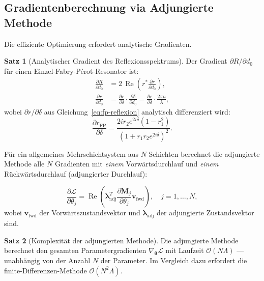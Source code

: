 ﻿\documentclass[a4paper,12pt]{article}
\theoremstyle{definition}
\newtheorem{satz}{Satz}[section]
\newcommand{\ordre}[1]{\mathcal{O}\!\left(#1\right)}
\newcommand{\Realteil}{\operatorname{Re}}
\newcommand{\vect}[1]{\bm{#1}}
\newcommand{\matr}[1]{\mathbf{#1}}
\begin{document}
	\subsection{Gradientenberechnung via Adjungierte Methode}
	
	Die effiziente Optimierung erfordert analytische Gradienten.
	
	\begin{satz}[Analytischer Gradient des Reflexionsspektrums]
		\label{satz:gradient}
		Der Gradient $\partial R/\partial d_0$ für einen Einzel-Fabry-Pérot-Resonator ist:
		\begin{align}
			\frac{\partial R}{\partial d_0}
			&= 2\,\Realteil\!\left(r^* \frac{\partial r}{\partial d_0}\right),
			\label{eq:gradient-R}\\
			\frac{\partial r}{\partial d_0}
			&= \frac{\partial r}{\partial \delta} \cdot \frac{\partial \delta}{\partial d_0}
			= \frac{\partial r}{\partial \delta} \cdot \frac{2\pi n}{\lambda},
			\label{eq:gradient-r}
		\end{align}
		wobei $\partial r/\partial\delta$ aus Gleichung~\eqref{eq:fp-reflexion}
		analytisch differenziert wird:
		\begin{equation}
			\frac{\partial r_\mathrm{FP}}{\partial \delta}
			= \frac{2i r_2 e^{2i\delta}(1 - r_1^2)}
			{(1 + r_1 r_2 e^{2i\delta})^2}.
			\label{eq:dr-ddelta}
		\end{equation}
	\end{satz}
	
	Für ein allgemeines Mehrschichtsystem aus $N$ Schichten berechnet die
	adjungierte Methode alle $N$ Gradienten mit \emph{einem} Vorwärtsdurchlauf
	und \emph{einem} Rückwärtsdurchlauf (adjungierter Durchlauf):
	
	\begin{equation}
		\frac{\partial \mathcal{L}}{\partial \theta_j} = \Realteil\!\left(
		\vect{\lambda}_\mathrm{adj}^T \frac{\partial \matr{M}_j}{\partial \theta_j} \vect{v}_\mathrm{fwd}
		\right), \quad j = 1,\ldots,N,
		\label{eq:adjoint}
	\end{equation}
	wobei $\vect{v}_\mathrm{fwd}$ der Vorwärtszustandsvektor und
	$\vect{\lambda}_\mathrm{adj}$ der adjungierte Zustandsvektor sind.
	
	\begin{satz}[Komplexität der adjungierten Methode]
		\label{satz:adjoint-komplex}
		Die adjungierte Methode berechnet den gesamten Parametergradienten
		$\nabla_{\vect{\theta}}\mathcal{L}$ mit Laufzeit $\ordre{N\Lambda}$ ---
		unabhängig von der Anzahl $N$ der Parameter. Im Vergleich dazu erfordert
		die finite-Differenzen-Methode $\ordre{N^2\Lambda}$.
	\end{satz}
	
\end{document}
